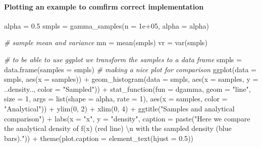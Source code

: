 \documentclass[
]{article}
\newenvironment{Shaded}{\begin{snugshade}}{\end{snugshade}}
\newcommand{\AttributeTok}[1]{\textcolor[rgb]{0.77,0.63,0.00}{#1}}
\newcommand{\CommentTok}[1]{\textcolor[rgb]{0.56,0.35,0.01}{\textit{#1}}}
\newcommand{\DecValTok}[1]{\textcolor[rgb]{0.00,0.00,0.81}{#1}}
\newcommand{\FloatTok}[1]{\textcolor[rgb]{0.00,0.00,0.81}{#1}}
\newcommand{\FunctionTok}[1]{\textcolor[rgb]{0.00,0.00,0.00}{#1}}
\newcommand{\NormalTok}[1]{#1}
\newcommand{\OtherTok}[1]{\textcolor[rgb]{0.56,0.35,0.01}{#1}}
\newcommand{\SpecialCharTok}[1]{\textcolor[rgb]{0.00,0.00,0.00}{#1}}
\newcommand{\StringTok}[1]{\textcolor[rgb]{0.31,0.60,0.02}{#1}}
\begin{document}
\hypertarget{plotting-an-example-to-comfirm-correct-implementation}{%
\paragraph{Plotting an example to comfirm correct
implementation}\label{plotting-an-example-to-comfirm-correct-implementation}}

\begin{Shaded}
\begin{Highlighting}[]
\NormalTok{alpha }\OtherTok{=} \FloatTok{0.5}
\NormalTok{smpls }\OtherTok{=} \FunctionTok{gamma\_samples}\NormalTok{(}\AttributeTok{n =} \FloatTok{1e+05}\NormalTok{, }\AttributeTok{alpha =}\NormalTok{ alpha)}

\CommentTok{\# sample mean and variance}
\NormalTok{mn }\OtherTok{=} \FunctionTok{mean}\NormalTok{(smpls)}
\NormalTok{vr }\OtherTok{=} \FunctionTok{var}\NormalTok{(smpls)}

\CommentTok{\# to be able to use ggplot we transform the samples to a data frame}
\NormalTok{smpls }\OtherTok{=} \FunctionTok{data.frame}\NormalTok{(}\AttributeTok{samples =}\NormalTok{ smpls)}
\CommentTok{\# making a nice plot for comparison}
\FunctionTok{ggplot}\NormalTok{(}\AttributeTok{data =}\NormalTok{ smpls, }\FunctionTok{aes}\NormalTok{(}\AttributeTok{x =}\NormalTok{ samples)) }\SpecialCharTok{+} \FunctionTok{geom\_histogram}\NormalTok{(}\AttributeTok{data =}\NormalTok{ smpls, }\FunctionTok{aes}\NormalTok{(}\AttributeTok{x =}\NormalTok{ samples, }
    \AttributeTok{y =}\NormalTok{ ..density.., }\AttributeTok{color =} \StringTok{"Sampled"}\NormalTok{)) }\SpecialCharTok{+} \FunctionTok{stat\_function}\NormalTok{(}\AttributeTok{fun =}\NormalTok{ dgamma, }\AttributeTok{geom =} \StringTok{"line"}\NormalTok{, }
    \AttributeTok{size =} \DecValTok{1}\NormalTok{, }\AttributeTok{args =} \FunctionTok{list}\NormalTok{(}\AttributeTok{shape =}\NormalTok{ alpha, }\AttributeTok{rate =} \DecValTok{1}\NormalTok{), }\FunctionTok{aes}\NormalTok{(}\AttributeTok{x =}\NormalTok{ samples, }\AttributeTok{color =} \StringTok{"Analytical"}\NormalTok{)) }\SpecialCharTok{+} 
    \FunctionTok{ylim}\NormalTok{(}\DecValTok{0}\NormalTok{, }\DecValTok{2}\NormalTok{) }\SpecialCharTok{+} \FunctionTok{xlim}\NormalTok{(}\DecValTok{0}\NormalTok{, }\DecValTok{4}\NormalTok{) }\SpecialCharTok{+} \FunctionTok{ggtitle}\NormalTok{(}\StringTok{"Samples and analytical comparison"}\NormalTok{) }\SpecialCharTok{+} \FunctionTok{labs}\NormalTok{(}\AttributeTok{x =} \StringTok{"x"}\NormalTok{, }
    \AttributeTok{y =} \StringTok{"density"}\NormalTok{, }\AttributeTok{caption =} \FunctionTok{paste}\NormalTok{(}\StringTok{"Here we compare the analytical density of f(x) (red line) }\SpecialCharTok{\textbackslash{}n}\StringTok{ with the sampled density (blue bars)."}\NormalTok{)) }\SpecialCharTok{+} 
    \FunctionTok{theme}\NormalTok{(}\AttributeTok{plot.caption =} \FunctionTok{element\_text}\NormalTok{(}\AttributeTok{hjust =} \FloatTok{0.5}\NormalTok{))}
\end{Highlighting}
\end{Shaded}
\end{document}
